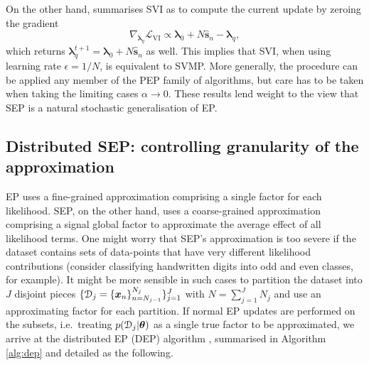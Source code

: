 On the other hand, \cite{mandt:smoothedSVI2014} summarises SVI as to compute the current update by zeroing the gradient
\begin{equation}
\nabla_{\bm{\lambda}_q} \mathcal{L}_{\text{VI}} \propto \bm{\lambda}_0 + N \hat{\bm{s}}_n - \bm{\lambda}_q,
\end{equation}
which returns $\bm{\lambda}_q^{t+1} = \bm{\lambda}_0 + N \hat{\bm{s}}_n$ as well. This implies that SVI, when using learning rate $\epsilon = 1/N$, is equivalent to SVMP. 
%
More generally, the procedure can be applied any member of the PEP family of algorithms, but care has to be taken when taking the limiting cases $\alpha \rightarrow 0$.
%
These results lend weight to the view that SEP is a natural stochastic generalisation of EP.

\subsection{Distributed SEP: controlling granularity of the approximation}
\label{sec:chap3_sep_dep}
EP uses a fine-grained approximation comprising a single factor for each likelihood. SEP, on the other hand, uses a coarse-grained approximation comprising a signal global factor to approximate the average effect of all likelihood terms. One might worry that SEP's approximation is too severe if the dataset contains sets of data-points that have very different likelihood contributions (consider classifying handwritten digits into odd and even classes, for example). 
It might be more sensible in such cases to partition the dataset into $J$ disjoint pieces $\{ \mathcal{D}_j = \{\bm{x}_n\}_{n=N_{j-1}}^{N_j} \}_{j=1}^{J}$ with $N = \sum_{j=1}^J N_j$ and use an approximating factor for each partition. If normal EP updates are performed on the subsets, i.e.~treating $p(\mathcal{D}_j |\bm{\theta})$ as a single true factor to be approximated, we arrive at the distributed EP (DEP) algorithm \citep{gelman:dep2014, xu:sms2014}, summarised in Algorithm \ref{alg:dep} and detailed as the following.


